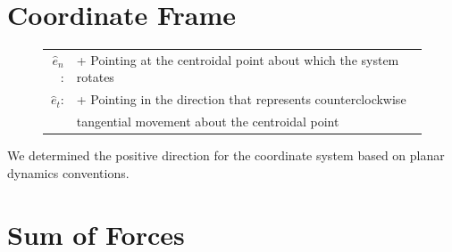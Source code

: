 \documentclass[12pt]{report}
\begin{document}
\begin{flushleft}
\section{Coordinate Frame}

\begin{figure}[h]
  \centering
   \begin{minipage}[c]{.15\textwidth}
      
   \end{minipage}%
   \begin{minipage}[c]{.85\textwidth}
     \flushleft
     \begin{tabular}{rl}
      $\hat{e}_n$:&+ Pointing at the centroidal point about which the system rotates\\
      $\hat{e}_t$:&+ Pointing in the direction that represents counterclockwise \\
      & \phantom{+ }tangential movement about the centroidal point \\
    \end{tabular}
   \end{minipage}
 \end{figure}
We determined the positive direction for the coordinate system based on planar dynamics
conventions.
\section{Sum of Forces}


\end{flushleft}
\end{document}
